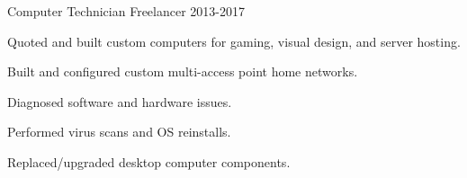 \begin{cventries}
  \cventry
    {Computer Technician}
    {Freelancer}
    {}
    {2013-2017}
    {
      \begin{cvitems}
        \item{Quoted and built custom computers for gaming, visual design, and server hosting.}%
        \item{Built and configured custom multi-access point home networks.}
        \item{Diagnosed software and hardware issues.}
        \item{Performed virus scans and OS reinstalls.}
        \item{Replaced/upgraded desktop computer components.}
      \end{cvitems}
    }

\end{cventries}

